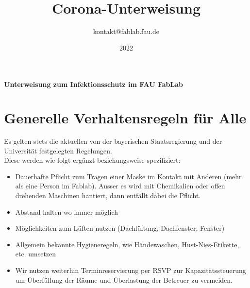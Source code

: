 \documentclass[13pt]{\basedir/fablab-document}
\date{2022}
\author{kontakt@fablab.fau.de}
\title{Corona-Unterweisung}
\begin{document}
\maketitle

\begin{center}
  \textbf{Unterweisung zum Infektionsschutz im FAU FabLab}
\end{center}

\vbox{\vspace{1cm}}

\section{Generelle Verhaltensregeln für Alle}
Es gelten stets die aktuellen von der bayerischen Staatsregierung und der Universität festgelegten Regelungen. \\
Diese werden wie folgt ergänzt beziehungsweise spezifiziert: 

\begin{itemize}
  \item  Dauerhafte Pflicht zum Tragen einer Maske im Kontakt mit Anderen (mehr als eine Person im Fablab). Ausser es wird mit Chemikalien oder offen drehenden Maschinen hantiert, dann entfällt dabei die Pflicht.
  \item  Abstand halten wo immer möglich
  \item  Möglichkeiten zum Lüften nutzen (Dachlüftung, Dachfenster, Fenster)
  \item  Allgemein bekannte Hygieneregeln, wie Händewaschen, Hust-Nies-Etikette, etc. umsetzen
  \item  Wir nutzen weiterhin Terminreservierung per RSVP zur Kapazitätssteuerung um Überfüllung der Räume und Überlastung der Betreuer zu vermeiden.
\end{itemize}


\end{document}
